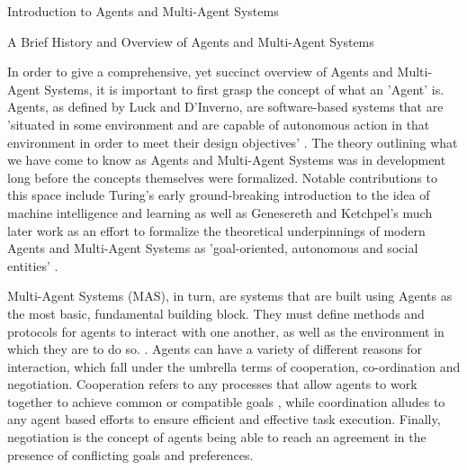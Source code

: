 \documentclass[a4paper,9pt]{scrartcl}
\title{\titletext}
\author{Michael Rice}
\makeatletter
\renewcommand{\subsection}{\@startsection{subsection}{2}{0mm}
  {0.25\baselineskip} 
  {0.25\baselineskip} 
  {\normalfont\normalsize\bfseries}}
\renewcommand{\section}{\@startsection{section}{1}{0mm}
  {1.5\baselineskip}
  {1\baselineskip} 
  {\normalfont\Large\bfseries}}
\makeatother
\begin{document}
\maketitle
\section{Introduction to Agents and Multi-Agent Systems}

\subsection{A Brief History and Overview of Agents and Multi-Agent Systems}

In order to give a comprehensive, yet succinct overview of Agents and Multi-Agent
Systems, it is important to first  grasp the concept of what an 'Agent'
is. Agents, as defined by Luck and D'Inverno, are software-based systems that are 'situated 
in some environment and are capable of autonomous action in that environment in order to meet 
their design objectives' \cite{luckConceptualFrameworkAgent2001}. The theory outlining what we 
have come to know as Agents and Multi-Agent Systems was in development long
before the concepts themselves were formalized. Notable contributions to this space include 
Turing's early ground-breaking introduction to the idea of machine intelligence and learning 
\cite{turingICOMPUTINGMACHINERYINTELLIGENCE1950} as well as Genesereth and Ketchpel's 
much later work as an effort to formalize the theoretical underpinnings of modern Agents and 
Multi-Agent Systems as 'goal-oriented, autonomous and social entities' 
\cite{geneserethSoftwareAgents1994}.

Multi-Agent Systems (MAS), in turn, are systems that are built using Agents as the most basic,
fundamental building block. They must define methods and protocols for agents to 
interact with one another, as well as the environment in which they are to do so. 
\cite{dorriMultiAgentSystemsSurvey2018}. Agents can have a variety of different 
reasons for interaction, which fall under the umbrella terms of cooperation, 
co-ordination and negotiation. Cooperation refers to any processes that allow agents 
to work together to achieve common or compatible goals 
\cite{wangMobileAgentv2MobileDevice2024}, while coordination alludes to any agent based 
efforts to ensure efficient and effective task execution. Finally, negotiation is 
the concept of agents being able to reach an agreement in the presence of 
conflicting goals and preferences. 
\end{document}

